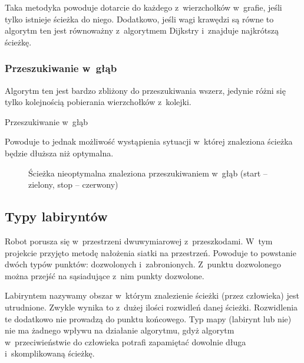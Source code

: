 \documentclass[11pt,a4paper,oneside]{mwart}
\begin{document}
Taka metodyka powoduje dotarcie do każdego z~wierzchołków w~grafie, jeśli tylko istnieje ścieżka do niego.
Dodatkowo, jeśli wagi krawędzi są równe to algorytm ten jest równoważny z~algorytmem Dijkstry i~znajduje 
najkrótszą ścieżkę.

\subsubsection{Przeszukiwanie w~głąb}
Algorytm ten jest bardzo zbliżony do przeszukiwania wszerz, jedynie różni się tylko kolejnością pobierania 
wierzchołków z~kolejki.
\begin{algorithm}
\caption{Przeszukiwanie w~głąb}
\label{algorytm_w_glab}
\begin{algorithmic}[1]
		\ENDIF
	\ENDFOR
\ENDWHILE
\end{algorithmic}
\end{algorithm}

Powoduje to jednak możliwość wystąpienia sytuacji w~której znaleziona ścieżka będzie dłuższa niż optymalna.

\begin{figure}[!h]
\centering
{}
\caption{Ścieżka nieoptymalna znaleziona przeszukiwaniem w~głąb (start -- zielony, stop -- czerwony)\label{petla}}
\end{figure}

\subsection{Typy labiryntów}
Robot porusza się w~przestrzeni dwuwymiarowej z~przeszkodami. 
W~tym projekcie przyjęto metodę nałożenia siatki na przestrzeń. 
Powoduje to powstanie dwóch typów punktów: dozwolonych i~zabronionych. 
Z~punktu dozwolonego można przejść na sąsiadujące z~nim punkty dozwolone.

Labiryntem nazywamy obszar w~którym znalezienie ścieżki (przez człowieka) jest utrudnione.
Zwykle wynika to z~dużej ilości rozwidleń danej ścieżki. 
Rozwidlenia te dodatkowo nie prowadzą do punktu końcowego. 
Typ mapy (labirynt lub nie) nie ma żadnego wpływu na działanie algorytmu, gdyż algorytm w~przeciwieństwie do 
człowieka potrafi zapamiętać dowolnie długa i~skomplikowaną ścieżkę.
\end{document}
